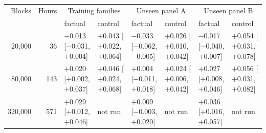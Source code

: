 \begin{tabular}{rrllllll}
\toprule
Blocks & Hours & \multicolumn{2}{c}{Training families} & \multicolumn{2}{c}{Unseen panel A} & \multicolumn{2}{c}{Unseen panel B} \\
 & & factual & control & factual & control & factual & control \\
\midrule
20{,}000 & 36 & $-$0.013 [$-$0.031, $+$0.004] & $+$0.043 [$+$0.022, $+$0.064] & $-$0.033 [$-$0.062, $-$0.005] & $+$0.026 [$+$0.010, $+$0.042] & $-$0.017 [$-$0.040, $+$0.007] & $+$0.054 [$+$0.031, $+$0.078] \\
80{,}000 & 143 & $+$0.020 [$+$0.002, $+$0.037] & $+$0.046 [$+$0.024, $+$0.068] & $+$0.004 [$-$0.011, $+$0.018] & $+$0.024 [$+$0.006, $+$0.042] & $+$0.027 [$+$0.008, $+$0.046] & $+$0.056 [$+$0.031, $+$0.082] \\
320{,}000 & 571 & $+$0.029 [$+$0.012, $+$0.046] & not run & $+$0.009 [$-$0.003, $+$0.020] & not run & $+$0.036 [$+$0.016, $+$0.057] & not run \\
\bottomrule
\end{tabular}
